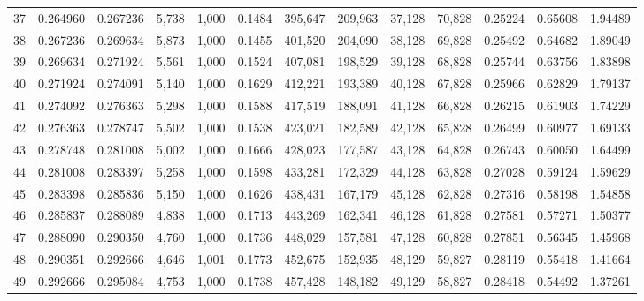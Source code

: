 \begin{tabular}{rrrrrrrrrrrrr}
37  &  0.264960 &  0.267236 &   5,738 &  1,000 &                                     0.1484 &  395,647 &  209,963 &   37,128 &   70,828 &  0.25224 &  0.65608 &  1.94489 \\
38  &  0.267236 &  0.269634 &   5,873 &  1,000 &                                     0.1455 &  401,520 &  204,090 &   38,128 &   69,828 &  0.25492 &  0.64682 &  1.89049 \\
39  &  0.269634 &  0.271924 &   5,561 &  1,000 &                                     0.1524 &  407,081 &  198,529 &   39,128 &   68,828 &  0.25744 &  0.63756 &  1.83898 \\
40  &  0.271924 &  0.274091 &   5,140 &  1,000 &                                     0.1629 &  412,221 &  193,389 &   40,128 &   67,828 &  0.25966 &  0.62829 &  1.79137 \\
41  &  0.274092 &  0.276363 &   5,298 &  1,000 &                                     0.1588 &  417,519 &  188,091 &   41,128 &   66,828 &  0.26215 &  0.61903 &  1.74229 \\
42  &  0.276363 &  0.278747 &   5,502 &  1,000 &                                     0.1538 &  423,021 &  182,589 &   42,128 &   65,828 &  0.26499 &  0.60977 &  1.69133 \\
43  &  0.278748 &  0.281008 &   5,002 &  1,000 &                                     0.1666 &  428,023 &  177,587 &   43,128 &   64,828 &  0.26743 &  0.60050 &  1.64499 \\
44  &  0.281008 &  0.283397 &   5,258 &  1,000 &                                     0.1598 &  433,281 &  172,329 &   44,128 &   63,828 &  0.27028 &  0.59124 &  1.59629 \\
45  &  0.283398 &  0.285836 &   5,150 &  1,000 &                                     0.1626 &  438,431 &  167,179 &   45,128 &   62,828 &  0.27316 &  0.58198 &  1.54858 \\
46  &  0.285837 &  0.288089 &   4,838 &  1,000 &                                     0.1713 &  443,269 &  162,341 &   46,128 &   61,828 &  0.27581 &  0.57271 &  1.50377 \\
47  &  0.288090 &  0.290350 &   4,760 &  1,000 &                                     0.1736 &  448,029 &  157,581 &   47,128 &   60,828 &  0.27851 &  0.56345 &  1.45968 \\
48  &  0.290351 &  0.292666 &   4,646 &  1,001 &                                     0.1773 &  452,675 &  152,935 &   48,129 &   59,827 &  0.28119 &  0.55418 &  1.41664 \\
49  &  0.292666 &  0.295084 &   4,753 &  1,000 &                                     0.1738 &  457,428 &  148,182 &   49,129 &   58,827 &  0.28418 &  0.54492 &  1.37261 \\

\end{tabular}

